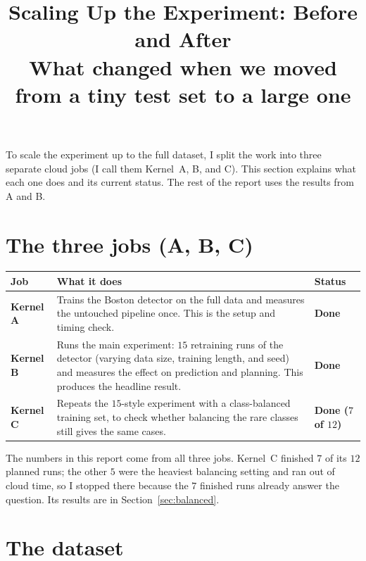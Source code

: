 \documentclass[11pt,a4paper]{article}
\title{Scaling Up the Experiment: Before and After\\
\large What changed when we moved from a tiny test set to a large one}
\date{}
\begin{document}
\maketitle
\vspace{-2em}

\noindent
To scale the experiment up to the full dataset, I split the work into three
separate cloud jobs (I call them Kernel~A, B, and C). This section explains what
each one does and its current status. The rest of the report uses the results
from A and B.

\section{The three jobs (A, B, C)}

\begin{table}[h!]
\centering
\renewcommand{\arraystretch}{1.35}
\begin{tabular}{@{}L{1.4cm}L{9.0cm}L{2.7cm}@{}}
\toprule
\textbf{Job} & \textbf{What it does} & \textbf{Status} \\
\midrule
\textbf{Kernel A} &
Trains the Boston detector on the full data and measures the untouched pipeline
once. This is the setup and timing check. &
\textbf{Done} \\
\textbf{Kernel B} &
Runs the main experiment: $15$ retraining runs of the detector (varying data
size, training length, and seed) and measures the effect on prediction and
planning. This produces the headline result. &
\textbf{Done} \\
\textbf{Kernel C} &
Repeats the $15$-style experiment with a class-balanced training set, to check
whether balancing the rare classes still gives the same cases. &
\textbf{Done ($7$ of $12$)} \\
\bottomrule
\end{tabular}
\end{table}

\noindent
The numbers in this report come from all three jobs. Kernel~C finished $7$ of its
$12$ planned runs; the other $5$ were the heaviest balancing setting and ran out
of cloud time, so I stopped there because the $7$ finished runs already answer the
question. Its results are in Section~\ref{sec:balanced}.

\section{The dataset}
\end{document}
